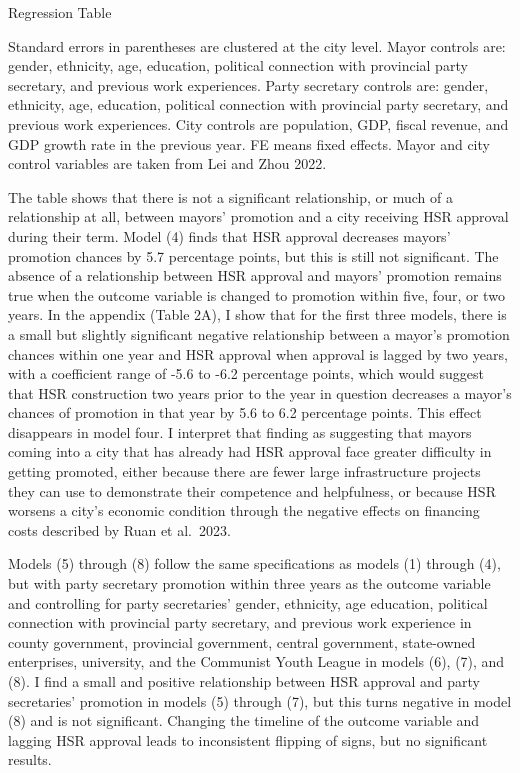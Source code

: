 \documentclass[12pt, ]{article}
\begin{document}
\begin{table}
  \centering
  \caption{Regression Table}
  \label{Table2}
  
  \caption*{Standard errors in parentheses are clustered at the city level. Mayor controls are: gender, ethnicity, age, education, political connection with provincial party secretary, and previous work experiences. Party secretary controls are: gender, ethnicity, age, education, political connection with provincial party secretary, and previous work experiences. City controls are population, GDP, fiscal revenue, and GDP growth rate in the previous year. FE means fixed effects. Mayor and city control variables are taken from Lei and Zhou 2022.}
\end{table}

The table shows that there is not a significant relationship, or much of
a relationship at all, between mayors' promotion and a city receiving
HSR approval during their term. Model (4) finds that HSR approval
decreases mayors' promotion chances by 5.7 percentage points, but this
is still not significant. The absence of a relationship between HSR
approval and mayors' promotion remains true when the outcome variable is
changed to promotion within five, four, or two years. In the appendix
(Table 2A), I show that for the first three models, there is a small but
slightly significant negative relationship between a mayor's promotion
chances within one year and HSR approval when approval is lagged by two
years, with a coefficient range of -5.6 to -6.2 percentage points, which
would suggest that HSR construction two years prior to the year in
question decreases a mayor's chances of promotion in that year by 5.6 to
6.2 percentage points. This effect disappears in model four. I interpret
that finding as suggesting that mayors coming into a city that has
already had HSR approval face greater difficulty in getting promoted,
either because there are fewer large infrastructure projects they can
use to demonstrate their competence and helpfulness, or because HSR
worsens a city's economic condition through the negative effects on
financing costs described by Ruan et al.~2023.

Models (5) through (8) follow the same specifications as models (1)
through (4), but with party secretary promotion within three years as
the outcome variable and controlling for party secretaries' gender,
ethnicity, age education, political connection with provincial party
secretary, and previous work experience in county government, provincial
government, central government, state-owned enterprises, university, and
the Communist Youth League in models (6), (7), and (8). I find a small
and positive relationship between HSR approval and party secretaries'
promotion in models (5) through (7), but this turns negative in model
(8) and is not significant. Changing the timeline of the outcome
variable and lagging HSR approval leads to inconsistent flipping of
signs, but no significant results.
\end{document}
